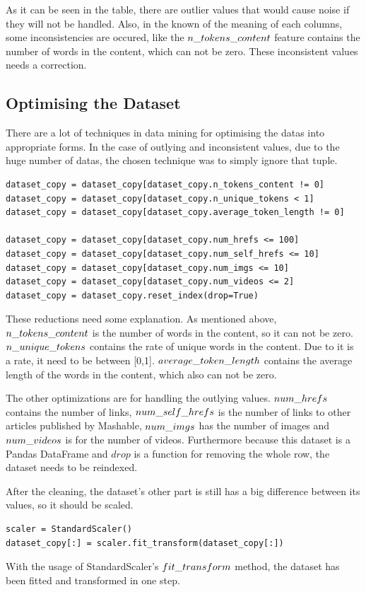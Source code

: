 \noindent As it can be seen in the table, there are outlier values that would cause noise if they will not be handled. Also, in the known of the meaning of each columns, some inconsistencies are occured, like the $n\char`_tokens\char`_content$ feature contains the number of words in the content, which can not be zero. These inconsistent values needs a correction.


\subsection{Optimising the Dataset}

There are a lot of techniques in data mining for optimising the datas into appropriate forms. In the case of outlying and inconsistent values, due to the huge number of datas, the chosen technique was to simply ignore that tuple. 
\begin{lstlisting}
dataset_copy = dataset_copy[dataset_copy.n_tokens_content != 0]
dataset_copy = dataset_copy[dataset_copy.n_unique_tokens < 1]
dataset_copy = dataset_copy[dataset_copy.average_token_length != 0]

dataset_copy = dataset_copy[dataset_copy.num_hrefs <= 100]
dataset_copy = dataset_copy[dataset_copy.num_self_hrefs <= 10]
dataset_copy = dataset_copy[dataset_copy.num_imgs <= 10]
dataset_copy = dataset_copy[dataset_copy.num_videos <= 2]
dataset_copy = dataset_copy.reset_index(drop=True)
\end{lstlisting}

These reductions need some explanation. As mentioned above, $n\char`_tokens\char`_content$ is the number of words in the content, so it can not be zero. $n\char`_unique\char`_tokens$ contains the rate of unique words in the content. Due to it is a rate, it need to be between [0,1]. $average\char`_token\char`_length$ contains the average length of the words in the content, which also can not be zero. \smallskip

The other optimizations are for handling the outlying values. $num\char`_hrefs$ contains the number of links, $num\char`_self\char`_hrefs$ is the number of links to other articles published by Mashable, $num\char`_imgs$ has the number of images and $num\char`_videos$ is for the number of videos. Furthermore because this dataset is a Pandas DataFrame and $drop$ is a function for removing the whole row, the dataset needs to be reindexed.\medskip

After the cleaning, the dataset's other part is still has a big difference between its values, so it should be scaled. 
\begin{lstlisting}
scaler = StandardScaler()
dataset_copy[:] = scaler.fit_transform(dataset_copy[:])
\end{lstlisting}
With the usage of StandardScaler's $fit\char`_transform$ method, the dataset has been fitted and transformed in one step. \medskip

